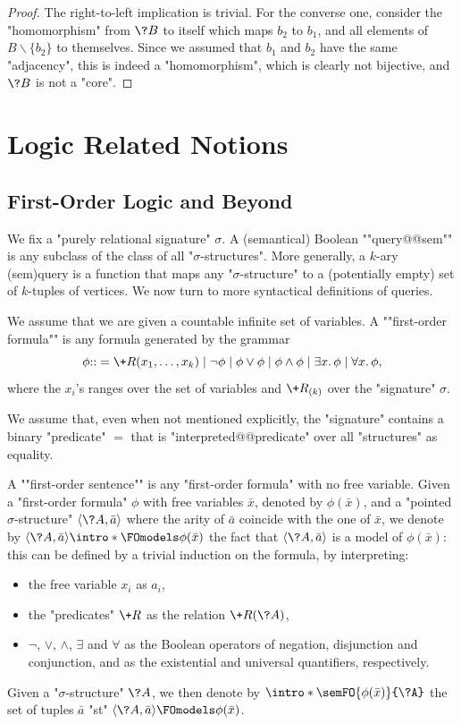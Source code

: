 \begin{proof}
	The right-to-left implication is trivial.
	For the converse one, consider the "homomorphism" from $\?B$ to itself
	which maps $b_2$ to $b_1$, and all elements of $B \smallsetminus \{b_2\}$
	to themselves. Since we assumed that $b_1$ and $b_2$ have the same "adjacency",
	this is indeed a "homomorphism", which is clearly not bijective, and
	$\?B$ is not a "core".
\end{proof}

\section{Logic Related Notions}

\subsection{First-Order Logic and Beyond}

We fix a "purely relational signature" $\sigma$.
A (semantical) Boolean \AP""query@@sem"" is any subclass of the
class of all "$\sigma$-structures".
More generally, a $k$-ary \reintro(sem){query} is a function
that maps any "$\sigma$-structure" to a (potentially empty) set of $k$-tuples
of vertices.
We now turn to more syntactical definitions of queries.

We assume that we are given a countable infinite set of variables.
A \AP""first-order formula"" is any formula generated by the grammar 
\[
	\phi {:}{:}= \+R(x_1,\dotsc,x_k) \mid \neg \phi \mid \phi \lor \phi \mid \phi \land \phi
	\mid \exists x.\, \phi \mid \forall x.\, \phi,
\]
where the $x_i$'s ranges over the set of variables and $\+R_{(k)}$ over the "signature" $\sigma$.

\begin{hypothesis}
We assume that, even when not mentioned explicitly, the "signature" contains
a binary "predicate" $=$ that is "interpreted@@predicate" over all "structures"
as equality.
\end{hypothesis}

A \AP""first-order sentence"" is any "first-order formula" with no free variable.
Given a "first-order formula" $\phi$ with free variables $\bar x$, denoted by $\phi(\bar x)$,
and a "pointed $\sigma$-structure" $\tup{\?A,\bar a}$ where the arity of $\bar a$ coincide with
the one of $\bar x$, we denote by $\tup{\?A,\bar a} \intro*\FOmodels \phi(\bar x)$
the fact that $\tup{\?A,\bar a}$ is a model of $\phi(\bar x)$: this can be defined by
a trivial induction on the formula, by interpreting:
\begin{itemize}
	\item the free variable $x_i$ as $a_i$,
	\item the "predicates" $\+R$ as the relation $\+R(\?A)$,
	\item $\neg$, $\lor$, $\land$, $\exists$ and $\forall$ as the Boolean operators of negation, disjunction and conjunction, and as the existential and universal quantifiers, respectively.
\end{itemize}
Given a "$\sigma$-structure" $\?A$, we then denote by \AP$\intro*\semFO{\phi(\bar x)}{\?A}$
the set of tuples $\bar a$ "st" $\tup{\?A, \bar a} \FOmodels \phi(\bar x)$.

